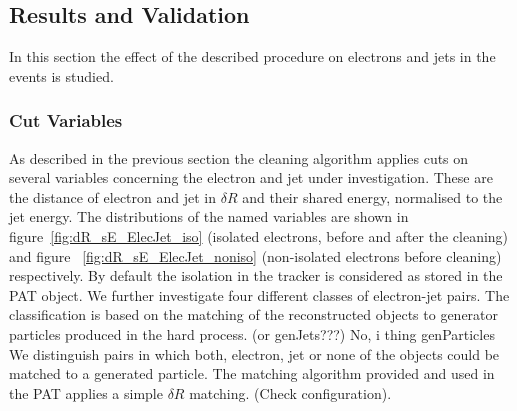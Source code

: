 \documentclass{cmspaper}
\begin{document}
\subsection{Results and Validation}
In this section the effect of the described procedure on electrons and jets in
the events is studied. %

\subsubsection{Cut Variables}
As described in the previous section the cleaning algorithm applies cuts on
several variables concerning the electron and jet under investigation. These are the distance of electron and jet in $\delta R$ and their shared energy, normalised to the jet energy. The distributions of the named variables are shown in figure~\ref{fig:dR_sE_ElecJet_iso} (isolated electrons, before and after the cleaning) and figure ~\ref{fig:dR_sE_ElecJet_noniso} (non-isolated electrons before cleaning) respectively. By default the isolation in the tracker is considered as stored
in the PAT object. We further investigate four different classes of electron-jet
pairs. The classification is based on the matching of the reconstructed objects
to generator particles produced in the hard process. {\color{red}(or genJets???) No, i thing genParticles} We distinguish pairs in which both, electron, jet or none of the objects could be
matched to a generated particle. The matching algorithm provided and used in the
PAT applies a simple $\delta R$ matching. {\color{red}(Check configuration)}.



\end{document}
